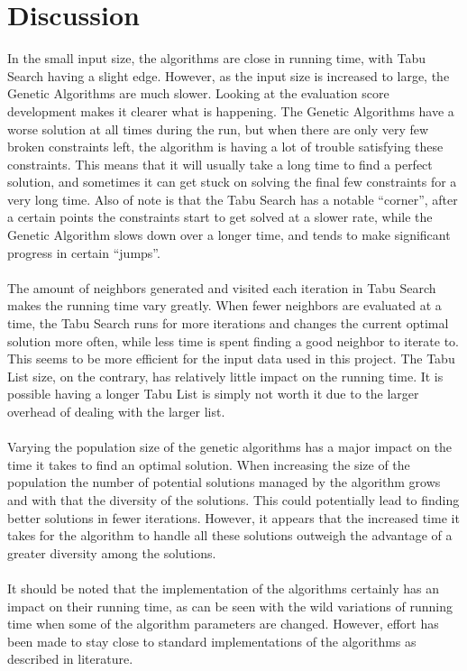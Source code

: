 \documentclass[titlepage,a4paper]{article}
\begin{document}
\pagebreak
\section{Discussion}
In the small input size, the algorithms are close in running time, with Tabu Search having a slight edge. However, as the input size is increased to large, the Genetic Algorithms are much slower. Looking at the evaluation score development makes it clearer what is happening. The Genetic Algorithms have a worse solution at all times during the run, but when there are only very few broken constraints left, the algorithm is having a lot of trouble satisfying these constraints. This means that it will usually take a long time to find a perfect solution, and sometimes it can get stuck on solving the final few constraints for a very long time.
Also of note is that the Tabu Search has a notable “corner”, after a certain points the constraints start to get solved at a slower rate, while the Genetic Algorithm slows down over a longer time, and tends to make significant progress in certain “jumps”. \\\\
The amount of neighbors generated and visited each iteration in Tabu Search makes the running time vary greatly. When fewer neighbors are evaluated at a time, the Tabu Search runs for more iterations and changes the current optimal solution more often, while less time is spent finding a good neighbor to iterate to. This seems to be more efficient for the input data used in this project.
The Tabu List size, on the contrary, has relatively little impact on the running time. It is possible having a longer Tabu List is simply not worth it due to the larger overhead of dealing with the larger list. \\\\
Varying the population size of the genetic algorithms has a major impact on the time it takes to find an optimal solution. When increasing the size of the population the number of potential solutions managed by the algorithm grows and with that the diversity of the solutions. This could potentially lead to finding better solutions in fewer iterations. However, it appears that the increased time it takes for the algorithm to handle all these solutions outweigh the advantage of a greater diversity among the solutions. \\\\
It should be noted that the implementation of the algorithms certainly has an impact on their running time, as can be seen with the wild variations of running time when some of the algorithm parameters are changed. However, effort has been made to stay close to standard implementations of the algorithms as described in literature.
\end{document}
